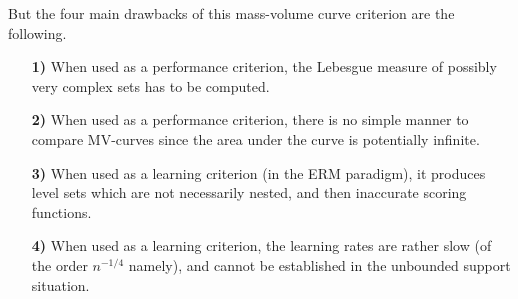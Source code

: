But the four main drawbacks of this mass-volume curve criterion are the following.
\begin{itemize}
\item[\textbf{1)}] When used as a performance criterion, the Lebesgue measure of possibly very complex sets has to be computed.
\item[\textbf{2)}] When used as a performance criterion, there is no simple manner to compare MV-curves since the area under the curve is potentially infinite. %
\item[\textbf{3)}] When used as a learning criterion (in the ERM paradigm), it produces level sets which are not necessarily nested, and then inaccurate scoring functions. 
\item[\textbf{4)}] When used as a learning criterion, the learning rates are rather slow (of the order $n^{-1/4}$ namely), and cannot be established in the unbounded support situation.
\end{itemize}







